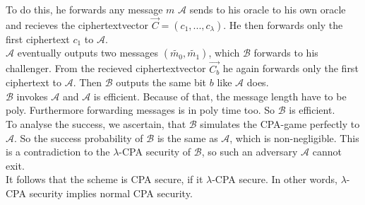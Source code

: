 \begin{itemize}
	To do this, he forwards any message \(m\) \(\mathcal{A}\) sends to his oracle to his own oracle and recieves the ciphertextvector \(\vec{C} = (c_1, ... , c_{\lambda})\). He then forwards only the first ciphertext \(c_1\) to \(\mathcal{A}\). \\
	\(\mathcal{A}\) eventually outputs two messages \((\widetilde{m_0}, \widetilde{m_1})\), which \(\mathcal{B}\) forwards to his challenger. From the recieved ciphertextvector \(\vec{C_b}\) he again forwards only the first ciphertext to \(\mathcal{A}\). Then \(\mathcal{B}\) outputs the same bit \(b\) like \(\mathcal{A}\) does. \\
	\(\mathcal{B}\) invokes \(\mathcal{A}\) and \(\mathcal{A}\) is efficient. Because of that, the message length have to be poly. Furthermore forwarding messages is in poly time too. So \(\mathcal{B}\) is efficient.\\
	To analyse the success, we ascertain, that \(\mathcal{B}\) simulates the CPA-game perfectly to \(\mathcal{A}\). So the success probability of \(\mathcal{B}\) is the same as \(\mathcal{A}\), which is non-negligible. This is a contradiction to the \(\lambda\)-CPA security of \(\mathcal{B}\), so such an adversary \(\mathcal{A}\) cannot exit. \\
	It follows that the scheme is CPA secure, if it \(\lambda\)-CPA secure. In other words, \(\lambda\)-CPA security implies normal CPA security.
\end{itemize}

